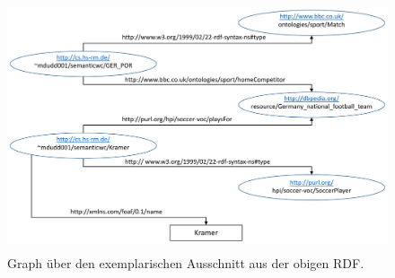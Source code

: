 \documentclass[runningheads,a4paper]{llncs}
\begin{document}
%
%
%


\begin{figure}
\centering
\includegraphics[height=7.4cm]{graph_manus}
\caption{Graph über den exemplarischen Ausschnitt aus der obigen RDF.}
\label{fig:onto}
\end{figure}
\end{document}

